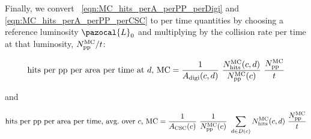 Finally, we convert \Eq~\ref{eqn:MC_hits_perA_perPP_perDigi} and \ref{eqn:MC_hits_perA_perPP_perCSC} to per time quantities by choosing a reference luminosity $\pazocal{L}_0$ and multiplying by the \pp collision rate per time at that luminosity, $N_\text{\ensuremath{\mathrm{p}}\ensuremath{\mathrm{p}}}^\text{MC}/t$:

\begin{equation}
	\label{eqn:MC_hits_perA_perT_perDigi}
\text{hits per \pp per area per time at $d$, MC} = 	\frac{1}{A_\text{digi}(c, d)}  \  \frac{N_\text{hits}^\text{MC}(c, d)}{N_\text{\pp}^\text{MC}(c)}  \  \frac{N_\text{\pp}^\text{MC}}{t} 
\end{equation}

and 

\begin{equation}
	\label{eqn:MC_hits_perA_perT_perCSC}
\text{hits per \pp per area per time, avg.\ over $c$, MC} = 
    \frac{1}{A_\text{CSC}(c)}  \  \frac{1}{N_\text{\pp}^\text{MC}(c)}  \  \sum_{d\in D(c)}{N_\text{hits}^\text{MC}(c, d)}  \  \frac{N_\text{\pp}^\text{MC}}{t} 
\end{equation}
 
